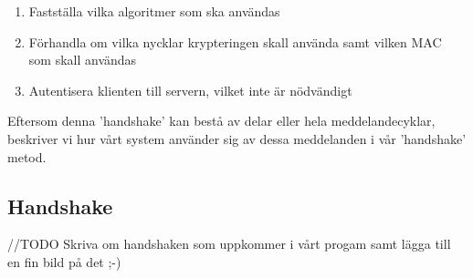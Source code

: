 \begin{enumerate}
\item{Fastställa vilka algoritmer som ska användas}
\item{Förhandla om vilka nycklar krypteringen skall använda samt vilken MAC som skall användas}
\item{Autentisera klienten till servern, vilket inte är nödvändigt}
\end{enumerate}

Eftersom denna 'handshake' kan bestå av delar eller hela meddelandecyklar, beskriver vi hur vårt system använder sig av dessa meddelanden i vår 'handshake' metod.

\subsection{Handshake}


//TODO Skriva om handshaken som uppkommer i vårt progam samt lägga till en fin bild på det ;-)